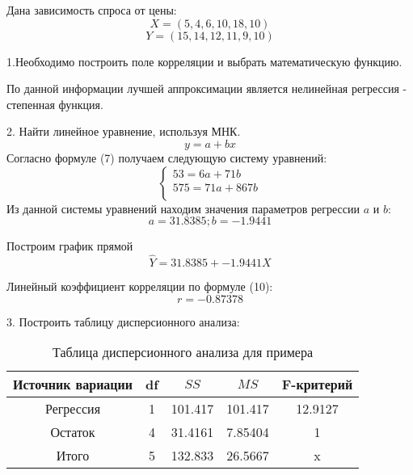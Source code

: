 \documentclass[aps,%
12pt,%
final,%
oneside,
onecolumn,%
musixtex, %
superscriptaddress,%
centertags]{article} %
\begin{document}
Дана зависимость спроса от цены:
$$ X = (5,4,6,10,18,10) $$
$$ Y = (15,14,12,11,9,10) $$

1.Необходимо построить поле корреляции и выбрать математическую функцию.

\begin{center}
\end{center}

По данной информации лучшей аппроксимации является нелинейная регрессия - степенная функция.

2. Найти линейное уравнение, используя МНК.
$$y = a + bx$$
Согласно формуле (7) получаем следующую систему уравнений:
$$ \left\{
\begin{matrix}
53 = 6a + 71b \\
575 = 71a + 867b \\
\end{matrix} \right. $$
Из данной системы уравнений находим значения параметров регрессии $a$ и $b$:
$$ a = 31.8385; b = -1.9441$$

Построим график прямой $$\widehat{Y} = 31.8385 + -1.9441X$$
\begin{center}
\end{center}

Линейный коэффициент корреляции по формуле (10):
$$ r = -0.87378$$

3. Построить таблицу дисперсионного анализа:

\label{first_table_analiz}
\begin{table}[H]
	\begin{center}
		\begin{tabular}[t]{|c|c|c|c|c|} \hline
		Источник вариации & df & $SS$ & $MS$ & F-критерий\\ \hline
		Регрессия & 1 & 101.417 & 101.417 & 12.9127 \\ \hline
		Остаток & 4 & 31.4161 & 7.85404 & 1 \\ \hline
		Итого & 5 & 132.833 & 26.5667 & x \\ \hline
		\end{tabular}
	\caption{Таблица дисперсионного анализа для примера}
	\end{center}
\end{table}
\end{document}
